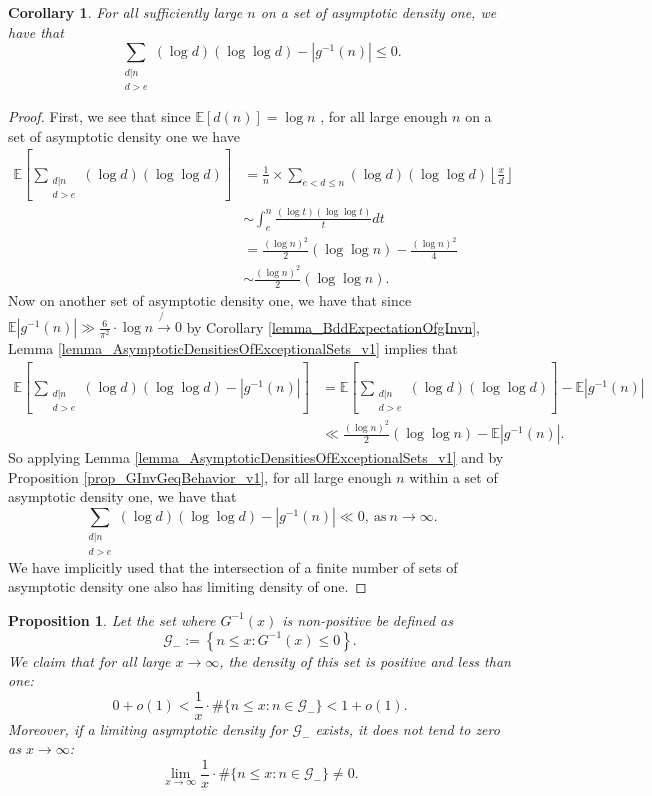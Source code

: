 \documentclass[11pt,reqno,a4letter]{article}
\numberwithin{figure}{section}
\numberwithin{table}{section}
\newcommand{\Floor}[2]{\ensuremath{\left\lfloor \frac{#1}{#2} \right\rfloor}}
\theoremstyle{plain}
\newtheorem{prop}[theorem]{Proposition}
\newtheorem{cor}[theorem]{Corollary}
\numberwithin{theorem}{section}
\theoremstyle{definition}
\begin{document}
\begin{cor} 
\label{cor_GInvGeqBehavior_v2} 
For all sufficiently large $n$ on a set of asymptotic density one, we have that 
\[
\sum_{\substack{d|n \\ d > e}} (\log d) (\log\log d) - |g^{-1}(n)| \leq 0. 
\]
\end{cor} 
\begin{proof} 
First, we see that since $\mathbb{E}[d(n)] = \log n$ \cite[\S 27.11]{NISTHB}, 
for all large enough $n$ on a set of asymptotic density one we have 
\begin{align*} 
\mathbb{E}\left[\sum_{\substack{d|n \\ d > e}} (\log d) (\log\log d)\right] & = 
     \frac{1}{n} \times \sum_{e < d \leq n} (\log d) (\log\log d) \Floor{x}{d} \\ 
     & \sim \int_{e}^{n} \frac{(\log t) (\log\log t)}{t} dt \\ 
     & = \frac{(\log n)^2}{2} (\log\log n) - \frac{(\log n)^2}{4} \\ 
     & \sim \frac{(\log n)^2}{2} (\log\log n). 
\end{align*} 
Now on another set of asymptotic density one, we have that since 
$\mathbb{E}|g^{-1}(n)| \gg \frac{6}{\pi^2} \cdot \log n \not{\rightarrow} 0$ by 
Corollary \ref{lemma_BddExpectationOfgInvn}, 
Lemma \ref{lemma_AsymptoticDensitiesOfExceptionalSets_v1} implies that 
\begin{align*} 
\mathbb{E}\left[\sum_{\substack{d|n \\ d > e}} (\log d) (\log\log d) - |g^{-1}(n)|\right] & = 
     \mathbb{E}\left[\sum_{\substack{d|n \\ d > e}} (\log d) (\log\log d)\right] - 
     \mathbb{E}|g^{-1}(n)| \\ 
     & \ll 
     \frac{(\log n)^2}{2} (\log\log n) - \mathbb{E}|g^{-1}(n)|. 
\end{align*} 
So applying Lemma \ref{lemma_AsymptoticDensitiesOfExceptionalSets_v1} and by 
Proposition \ref{prop_GInvGeqBehavior_v1}, for all large enough $n$ 
within a set of asymptotic density one, we have that 
\[
\sum_{\substack{d|n \\ d > e}} (\log d) (\log\log d) - |g^{-1}(n)| \ll 0, 
     \mathrm{\ as\ } n \rightarrow \infty. 
\] 
We have implicitly used that the intersection of a finite number of sets of 
asymptotic density one also has limiting density of one. 
\end{proof} 

\begin{prop} 
\label{prop_DensityOfGInvxPosAndBdd} 
Let the set where $G^{-1}(x)$ is non-positive be defined as 
\[
\mathcal{G}_{-} := \left\{n \leq x: G^{-1}(x) \leq 0\right\}. 
\]
We claim that for all large $x \rightarrow \infty$, the density of this set is 
positive and less than one: 
\[
0 + o(1) < \frac{1}{x} \cdot \#\{n \leq x: n \in \mathcal{G}_{-}\} < 1 + o(1). 
\]
Moreover, if a limiting asymptotic density for $\mathcal{G}_{-}$ exists, it does not 
tend to zero as $x \rightarrow \infty$: 
\[
\lim_{x \rightarrow \infty} \frac{1}{x} \cdot \#\{n \leq x: n \in \mathcal{G}_{-}\} \neq 0. 
\]
\end{prop} 
\end{document}

